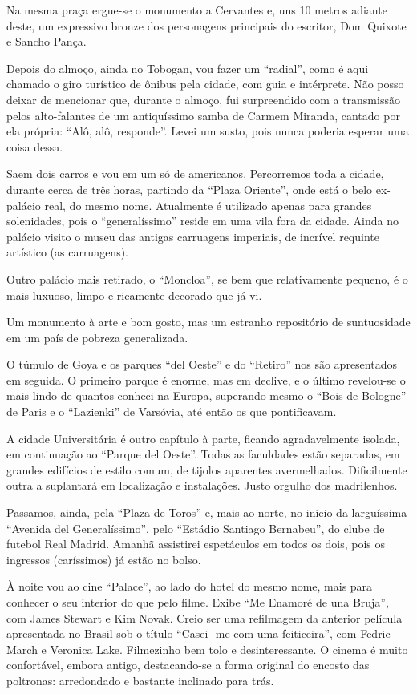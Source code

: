 Na mesma praça ergue-se o monumento a Cervantes e, uns 10 metros adiante deste, um expressivo bronze dos personagens principais do escritor, Dom Quixote e Sancho Pança.

Depois do almoço, ainda no Tobogan, vou fazer um “radial”, como é aqui chamado o giro turístico de ônibus pela cidade, com guia e intérprete. Não posso deixar de mencionar que, durante o almoço, fui surpreendido com a transmissão pelos alto-falantes de um antiquíssimo samba de Carmem Miranda, cantado por ela própria: “Alô, alô, responde”. Levei um susto, pois nunca poderia esperar uma coisa dessa.

Saem dois carros e vou em um só de americanos. Percorremos toda a cidade, durante cerca de três horas, partindo da “Plaza Oriente”, onde está o belo ex-palácio real, do mesmo nome. Atualmente é utilizado apenas para grandes solenidades, pois o “generalíssimo” reside em uma vila fora da cidade. Ainda no palácio visito o museu das antigas carruagens imperiais, de incrível requinte artístico (as carruagens).

Outro palácio mais retirado, o “Moncloa”, se bem que relativamente pequeno, é o mais luxuoso, limpo e ricamente decorado que já vi.

Um monumento à arte e bom gosto, mas um estranho repositório de suntuosidade em um país de pobreza generalizada.

O túmulo de Goya e os parques “del Oeste” e do “Retiro” nos são apresentados em seguida. O primeiro parque é enorme, mas em declive, e o último revelou-se o mais lindo de quantos conheci na Europa, superando mesmo o “Bois de Bologne” de Paris e o “Lazienki” de Varsóvia, até então os que pontificavam.

A cidade Universitária é outro capítulo à parte, ficando agradavelmente isolada, em continuação ao “Parque del Oeste”. Todas as faculdades estão separadas, em grandes edifícios de estilo comum, de tijolos aparentes avermelhados. Dificilmente outra a suplantará em localização e instalações. Justo orgulho dos madrilenhos.

Passamos, ainda, pela “Plaza de Toros” e, mais ao norte, no início da larguíssima “Avenida del Generalíssimo”, pelo “Estádio Santiago Bernabeu”, do clube de futebol Real Madrid. Amanhã assistirei espetáculos em todos os dois, pois os ingressos (caríssimos) já estão no bolso.

À noite vou ao cine “Palace”, ao lado do hotel do mesmo nome, mais para conhecer o seu interior do que pelo filme. Exibe “Me Enamoré de una Bruja”, com James Stewart e Kim Novak. Creio ser uma refilmagem da anterior película apresentada no Brasil sob o título “Casei- me com uma feiticeira”, com Fedric March e Veronica Lake. Filmezinho bem tolo e desinteressante. O cinema é muito confortável, embora antigo, destacando-se a forma original do encosto das poltronas: arredondado e bastante inclinado para trás.

